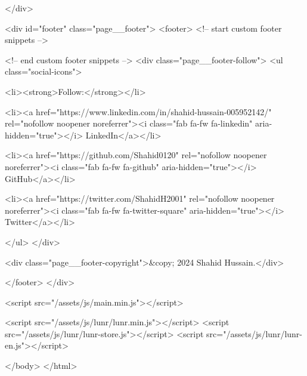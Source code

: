       </div>
    

    <div id="footer" class="page__footer">
      <footer>
        <!-- start custom footer snippets -->

<!-- end custom footer snippets -->
        <div class="page__footer-follow">
  <ul class="social-icons">
    
      <li><strong>Follow:</strong></li>
    

    
      
        
          <li><a href="https://www.linkedin.com/in/shahid-hussain-005952142/" rel="nofollow noopener noreferrer"><i class="fab fa-fw fa-linkedin" aria-hidden="true"></i> LinkedIn</a></li>
        
      
        
          <li><a href="https://github.com/Shahid0120" rel="nofollow noopener noreferrer"><i class="fab fa-fw fa-github" aria-hidden="true"></i> GitHub</a></li>
        
      
        
          <li><a href="https://twitter.com/ShahidH2001" rel="nofollow noopener noreferrer"><i class="fab fa-fw fa-twitter-square" aria-hidden="true"></i> Twitter</a></li>
        
      
    
  </ul>
</div>

<div class="page__footer-copyright">&copy; 2024 Shahid Hussain.</div>

      </footer>
    </div>

    
  <script src="/assets/js/main.min.js"></script>




<script src="/assets/js/lunr/lunr.min.js"></script>
<script src="/assets/js/lunr/lunr-store.js"></script>
<script src="/assets/js/lunr/lunr-en.js"></script>







  </body>
</html>
